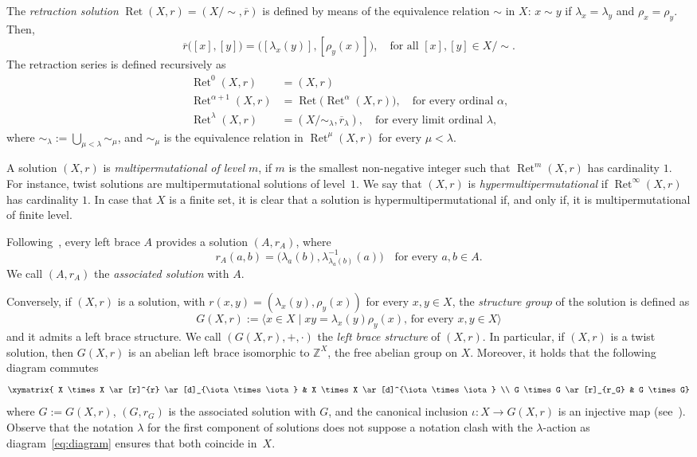 \documentclass[12pt, a4paper, english]{article}
\theoremstyle{definition}
\DeclareMathOperator{\Ret}{Ret}
\begin{document}
The \emph{retraction solution} $\operatorname{Ret}(X,r) = (X/\!\sim,\overline{r})$ is defined by means of the equivalence relation $\sim$ in $X$: $x\sim y$ if $\lambda_x = \lambda_y$ and $\rho_x = \rho_y$. Then,
\[ \overline{r}\big([x], [y]\big) = \big([\lambda_x(y)], [\rho_y(x)]\big), \quad \text{for all $[x], [y] \in X/\! \sim$}.\]
The retraction series is defined recursively as
\begin{align*}
\operatorname{Ret}^0(X, r) & = (X,r)\\
\operatorname{Ret}^{\alpha+1}(X,r) & = \operatorname{Ret}\big(\operatorname{Ret}^\alpha(X,r)\big), \quad \text{for every ordinal $\alpha$,}\\
\operatorname{Ret}^{\lambda}(X,r) & = (X/\!\sim_{\lambda}, \overline{r}_{\lambda}),  \quad \text{for every limit ordinal $\lambda$,}
\end{align*}
where $\sim_{\lambda} := \bigcup_{\mu< \lambda} \sim_{\mu}$, and $\sim_\mu$ is the equivalence relation  in $\operatorname{Ret}^{\mu}(X,r)$ for every $\mu < \lambda$.


A solution $(X,r)$ is \emph{multipermutational of level} $m$, if $m$ is the smallest non-negative integer such that $\operatorname{Ret}^m(X,r)$ has cardinality $1$. For instance, twist solutions are multipermutational solutions of level~$1$. We say that $(X,r)$ is \emph{hypermultipermutational} if $\Ret^\infty(X,r)$ has cardinality $1$. In case that $X$ is a finite set, it is clear that a solution is hypermultipermutational if, and only if, it is multipermutational of finite level.


Following~\cite{Rump07}, every left brace $A$ provides a solution $(A, r_A)$, where 
\[ r_A(a,b) = \big(\lambda_a(b), \lambda^{-1}_{\lambda_a(b)}(a)\big) \quad \text{for every $a,b\in A$.}\]
We call $(A,r_A)$ the \emph{associated solution} with $A$. 

Conversely, if $(X,r)$ is a solution, with $r(x,y) = (\lambda_x(y),\rho_y(x))$ for every $x,y\in X$, the \emph{structure group} of the solution is defined as
\[ G(X,r):= \langle x\in X \mid xy = \lambda_x(y)\rho_y(x), \, \text{for every $x,y\in X$}\rangle\]
and it admits a left brace structure. We call $(G(X,r), + ,\cdot)$ the \emph{left brace structure} of $(X,r)$. In particular, if $(X,r)$ is a twist solution, then $G(X,r)$ is an abelian left brace isomorphic to $\mathbb{Z}^X$, the free abelian group on $X$.  Moreover, it holds that the following diagram commutes
\begin{equation}
\label{eq:diagram}
 \xymatrix{ X \times X \ar[r]^{r} \ar[d]_{\iota \times \iota} & X \times X \ar[d]^{\iota \times \iota} \\ G \times G \ar[r]_{r_G} & G \times G}
\end{equation}
where $G:= G(X,r)$, $(G, r_G)$ is the associated solution with $G$, and the canonical inclusion $\iota\colon X \rightarrow G(X,r)$ is an injective map (see~\cite{EtingofSchedlerSoloviev99}). Observe that the notation $\lambda$ for the first component of solutions does not suppose a notation clash with the $\lambda$-action as diagram~\eqref{eq:diagram} ensures that both coincide in~$X$.
\end{document}

